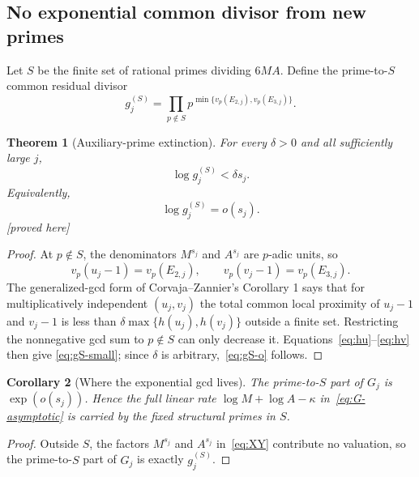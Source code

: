 \documentclass[11pt,oneside]{article}
\newtheorem{theorem}{Theorem}[section]
\newtheorem{corollary}[theorem]{Corollary}
\theoremstyle{definition}
\theoremstyle{remark}
\newcommand{\proved}{\textcolor{deepgreen}{\textsf{[proved here]}}}
\begin{document}
\subsection{No exponential common divisor from new primes}

Let $S$ be the finite set of rational primes dividing $6MA$.  Define the prime-to-$S$ common
residual divisor
\begin{equation}
 g_j^{(S)}=
 \prod_{p\notin S}p^{\min\{v_p(E_{2,j}),v_p(E_{3,j})\}}.
 \label{eq:gS}
\end{equation}

\begin{theorem}[Auxiliary-prime extinction]
\label{thm:aux-gcd}
For every $\delta>0$ and all sufficiently large $j$,
\begin{equation}
 \log g_j^{(S)}<\delta s_j.
 \label{eq:gS-small}
\end{equation}
Equivalently,
\begin{equation}
 \log g_j^{(S)}=o(s_j).
 \label{eq:gS-o}
\end{equation}
\proved
\end{theorem}

\begin{proof}
At $p\notin S$, the denominators $M^{s_j}$ and $A^{s_j}$ are $p$-adic units, so
\[
 v_p(u_j-1)=v_p(E_{2,j}),\qquad
 v_p(v_j-1)=v_p(E_{3,j}).
\]
The generalized-gcd form of Corvaja--Zannier's Corollary 1 says that for multiplicatively
independent $(u_j,v_j)$ the total common local proximity of $u_j-1$ and $v_j-1$ is less than
$\delta\max\{h(u_j),h(v_j)\}$ outside a finite set.  Restricting the nonnegative gcd sum to
$p\notin S$ can only decrease it.  Equations~\eqref{eq:hu}--\eqref{eq:hv} then give
\eqref{eq:gS-small}; since $\delta$ is arbitrary,~\eqref{eq:gS-o} follows.
\end{proof}

\begin{corollary}[Where the exponential gcd lives]
\label{cor:gcd-support}
The prime-to-$S$ part of $G_j$ is $\exp(o(s_j))$.  Hence the full linear rate
$\log M+\log A-\kappa$ in~\eqref{eq:G-asymptotic} is carried by the fixed structural primes
in $S$.
\end{corollary}

\begin{proof}
Outside $S$, the factors $M^{s_j}$ and $A^{s_j}$ in~\eqref{eq:XY} contribute no valuation,
so the prime-to-$S$ part of $G_j$ is exactly $g_j^{(S)}$.
\end{proof}
\end{document}
